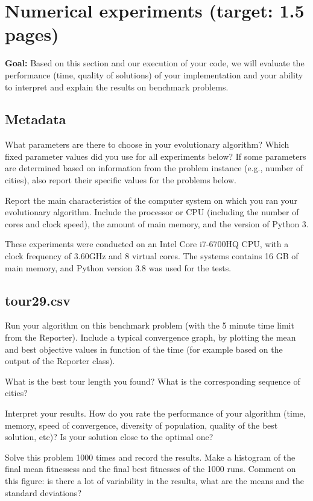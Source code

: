 \documentclass[a4paper,10pt]{article}
\newcommand{\ReplaceMe}[1]{{\color{blue}#1}}
\newcommand{\RemoveMe}[1]{{\color{purple}#1}}
\begin{document}
\section{Numerical experiments (target: 1.5 pages)}

\RemoveMe{\textbf{Goal:} Based on this section and our execution of your code, we will evaluate the performance (time, quality of solutions) of your implementation and your ability to interpret and explain the results on benchmark problems.}

\subsection{Metadata}

\ReplaceMe{What parameters are there to choose in your evolutionary algorithm? Which fixed parameter values did you use for all experiments below? If some parameters are determined based on information from the problem instance (e.g., number of cities), also report their specific values for the problems below.

Report the main characteristics of the computer system on which you ran your evolutionary algorithm. Include the processor or CPU (including the number of cores and clock speed), the amount of main memory, and the version of Python 3.}
These experiments were conducted on an Intel Core i7-6700HQ CPU, with a clock frequency of 3.60GHz and 8 virtual cores. The systems contains 16 GB of main memory, and Python version 3.8 was used for the tests.

\subsection{tour29.csv}

\ReplaceMe{Run your algorithm on this benchmark problem (with the 5 minute time limit from the Reporter). Include a typical convergence graph, by plotting the mean and best objective values in function of the time (for example based on the output of the Reporter class). 

What is the best tour length you found? What is the corresponding sequence of cities? 

Interpret your results. How do you rate the performance of your algorithm (time, memory, speed of convergence, diversity of population, quality of the best solution, etc)? Is your solution close to the optimal one?

Solve this problem 1000 times and record the results. Make a histogram of the final mean fitnessess and the final best fitnesses of the 1000 runs. Comment on this figure: is there a lot of variability in the results, what are the means and the standard deviations?}
\end{document}
